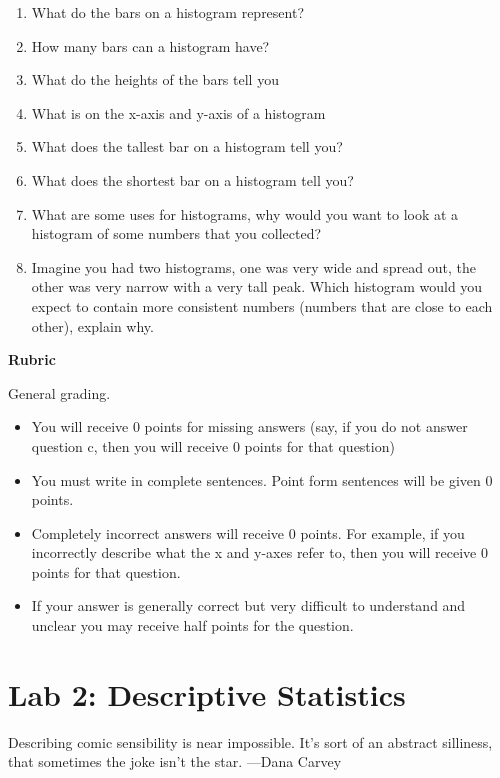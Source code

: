 \documentclass[
]{book}
\providecommand{\tightlist}{%
  \setlength{\itemsep}{0pt}\setlength{\parskip}{0pt}}
\begin{document}
\begin{enumerate}
\def\labelenumi{\alph{enumi}.}
\tightlist
\item
  What do the bars on a histogram represent?
\item
  How many bars can a histogram have?
\item
  What do the heights of the bars tell you
\item
  What is on the x-axis and y-axis of a histogram
\item
  What does the tallest bar on a histogram tell you?
\item
  What does the shortest bar on a histogram tell you?
\item
  What are some uses for histograms, why would you want to look at a histogram of some numbers that you collected?
\item
  Imagine you had two histograms, one was very wide and spread out, the other was very narrow with a very tall peak. Which histogram would you expect to contain more consistent numbers (numbers that are close to each other), explain why.
\end{enumerate}

\textbf{Rubric}

General grading.

\begin{itemize}
\tightlist
\item
  You will receive 0 points for missing answers (say, if you do not answer question c, then you will receive 0 points for that question)
\item
  You must write in complete sentences. Point form sentences will be given 0 points.
\item
  Completely incorrect answers will receive 0 points. For example, if you incorrectly describe what the x and y-axes refer to, then you will receive 0 points for that question.
\item
  If your answer is generally correct but very difficult to understand and unclear you may receive half points for the question.
\end{itemize}

\hypertarget{lab-2-descriptive-statistics}{%
\chapter{Lab 2: Descriptive Statistics}\label{lab-2-descriptive-statistics}}

{Describing comic sensibility is near impossible. It's sort of an abstract silliness, that sometimes the joke isn't the star. ---Dana Carvey}
\end{document}
